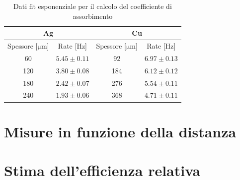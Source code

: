 \documentclass[twocolumn,10pt]{asme2ej}
\begin{document}
\begin{table}[t]
    \begin{center}
        \begin{tabular}{c c | c c}
            \multicolumn{2}{c}{\textbf{Ag}} & \multicolumn{2}{c}{\textbf{Cu}} \\ 
            \hline
            \multicolumn{1}{c}{Spessore [$\si{\micro\metre}$]} & \multicolumn{1}{c|}{Rate [Hz]} & \multicolumn{1}{c}{Spessore [$\si{\micro\metre}$]} & \multicolumn{1}{c}{Rate [Hz]} \\
            60                           & $5.45  \pm 0.11 $                    & 92                           & $6.97 \pm 0.13$                    \\
            120                          & $3.80  \pm 0.08 $                    & 184                          & $6.12 \pm 0.12$                    \\
            180                          & $2.42  \pm  0.07$                    & 276                          & $5.54 \pm 0.11$                      \\
            240                          & $1.93  \pm  0.06$                    & 368                          & $4.71 \pm 0.11$                      \\  
            \hline
        \end{tabular} 
    \end{center}
    \caption{Dati fit esponenziale per il calcolo del coefficiente di assorbimento}
    \label{t:assorbimento}
\end{table}

\clearpage
\section{Misure in funzione della distanza}\label{s:distanza}








\section{Stima dell'efficienza relativa}\label{s:efficienza}
\end{document}
